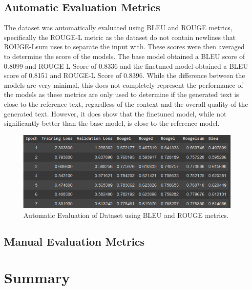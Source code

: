 \subsection{Automatic Evaluation Metrics}
The dataset was automatically evaluated using BLEU and ROUGE metrics, specifically the ROUGE-L metric as the dataset do not contain newlines that ROUGE-Lsum uses to separate the input with. These scores were then averaged to determine the score of the models. The base model obtained a BLEU score of 0.8099 and ROUGE-L Score of 0.8336 and the finetuned model obtained a BLEU score of 0.8151 and ROUGE-L Score of 0.8396. While the difference between the models are very minimal, this does not completely represent the performance of the models as these metrics are only used to determine if the generated text is close to the reference text, regardless of the context and the overall quality of the generated text. However, it does show that the finetuned model, while not significantly better than the base model, is close to the reference model.

\begin{figure}
	\caption{Automatic Evaluation of Dataset using BLEU and ROUGE metrics.}
	\centering
	\includegraphics[scale=0.6]{figures/AutomaticEvaluationMetrics.png}
\end{figure}

\subsection{Manual Evaluation Metrics}
\section{Summary}

